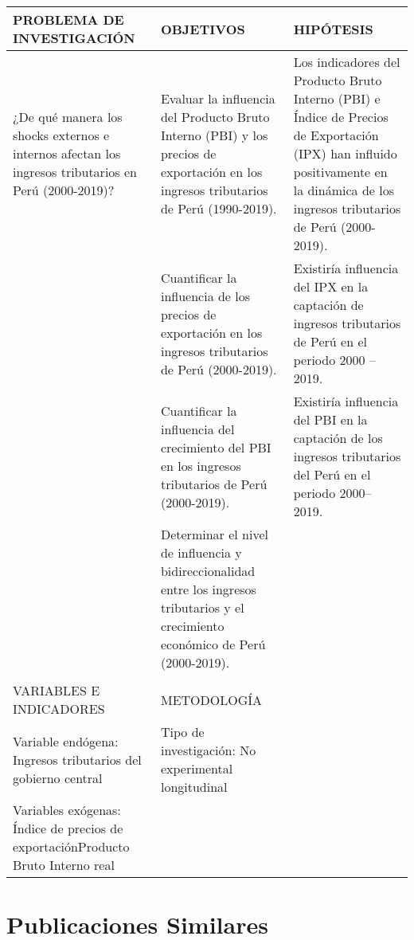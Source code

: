 \documentclass[
  man,
  floatsintext,
  longtable,
  a4paper,
  nolmodern,
  notxfonts,
  notimes,
  colorlinks=true,linkcolor=blue,citecolor=blue,urlcolor=blue]{apa7}
\begin{document}
\begin{longtable}[]{@{}
  >{\raggedright\arraybackslash}p{}
  >{\raggedright\arraybackslash}p{}
  >{\raggedright\arraybackslash}p{}@{}}
\toprule\noalign{}
\begin{minipage}[b]{\linewidth}\raggedright
PROBLEMA DE INVESTIGACIÓN
\end{minipage} & \begin{minipage}[b]{\linewidth}\raggedright
OBJETIVOS
\end{minipage} & \begin{minipage}[b]{\linewidth}\raggedright
HIPÓTESIS
\end{minipage} \\
\midrule\noalign{}
\endhead
\bottomrule\noalign{}
\endlastfoot
¿De qué manera los shocks externos e internos afectan los ingresos
tributarios en Perú (2000-2019)? & Evaluar la influencia del Producto
Bruto Interno (PBI) y los precios de exportación en los ingresos
tributarios de Perú (1990-2019). & Los indicadores del Producto Bruto
Interno (PBI) e Índice de Precios de Exportación (IPX) han influido
positivamente en la dinámica de los ingresos tributarios de Perú
(2000-2019). \\
& Cuantificar la influencia de los precios de exportación en los
ingresos tributarios de Perú (2000-2019). & Existiría influencia del IPX
en la captación de ingresos tributarios de Perú en el periodo 2000 --
2019. \\
& Cuantificar la influencia del crecimiento del PBI en los ingresos
tributarios de Perú (2000-2019). & Existiría influencia del PBI en la
captación de los ingresos tributarios del Perú en el periodo 2000--
2019. \\
& Determinar el nivel de influencia y bidireccionalidad entre los
ingresos tributarios y el crecimiento económico de Perú (2000-2019).
& \\
& & \\
VARIABLES E INDICADORES & METODOLOGÍA & \\
Variable endógena: Ingresos tributarios del gobierno central & Tipo de
investigación: No experimental longitudinal & \\
Variables exógenas: Índice de precios de exportaciónProducto Bruto
Interno real & & \\
\end{longtable}

\section{Publicaciones Similares}\label{publicaciones-similares}
\end{document}
